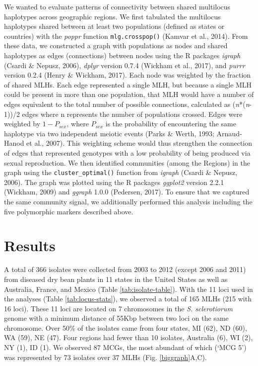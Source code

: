 \documentclass[fleqn,10pt,lineno]{wlpeerj} %
\theoremstyle{definition}
\theoremstyle{definition}
\theoremstyle{definition}
\theoremstyle{remark}
\begin{document}
We wanted to evaluate patterns of connectivity between shared multilocus
haplotypes across geographic regions. We first tabulated the multilocus
haplotypes shared between at least two populations (defined as states or
countries) with the \emph{poppr} function \texttt{mlg.crosspop()}
(Kamvar et al., 2014). From these data, we constructed a graph with
populations as nodes and shared haplotypes as edges (connections)
between nodes using the R packages \emph{igraph} (Csardi \& Nepusz,
2006), \emph{dplyr} version 0.7.4 (Wickham et al., 2017), and
\emph{purrr} version 0.2.4 (Henry \& Wickham, 2017). Each node was
weighted by the fraction of shared MLHs. Each edge represented a single
MLH, but because a single MLH could be present in more than one
population, that MLH would have a number of edges equivalent to the
total number of possible connections, calculated as
(\emph{n}*(\emph{n}-1))/2 edges where n represents the number of
populations crossed. Edges were weighted by \(1-P_{sex}\), where
\(P_{sex}\) is the probability of encountering the same haplotype via
two independent meiotic events (Parks \& Werth, 1993; Arnaud-Hanod et
al., 2007). This weighting scheme would thus strengthen the connection
of edges that represented genotypes with a low probability of being
produced via sexual reproduction. We then identified communities (among
the Regions) in the graph using the \texttt{cluster\_optimal()} function
from \emph{igraph} (Csardi \& Nepusz, 2006). The graph was plotted using
the R packages \emph{ggplot2} version 2.2.1 (Wickham, 2009) and
\emph{ggraph} 1.0.0 (Pedersen, 2017). To ensure that we captured the
same community signal, we additionally performed this analysis including
the five polymorphic markers described above.

\section*{Results}\label{results}

A total of 366 isolates were collected from 2003 to 2012 (except 2006
and 2011) from diseased dry bean plants in 11 states in the United
States as well as Australia, France, and Mexico (Table
\ref{tab:isolate-table}). With the 11 loci used in the analyses (Table
\ref{tab:locus-stats}), we observed a total of 165 MLHs (215 with 16
loci). These 11 loci are located on 7 chromosomes in the \emph{S.
sclerotiorum} genome with a minimum distance of 55Kbp between two loci
on the same chromosome. Over 50\% of the isolates came from four states,
MI (62), ND (60), WA (59), NE (47). Four regions had fewer than 10
isolates, Australia (6), WI (2), NY (1), ID (1). We observed 87 MCGs,
the most abundant of which (`MCG 5') was represented by 73 isolates over
37 MLHs (Fig. \ref{biggraph}A,C).
\end{document}
